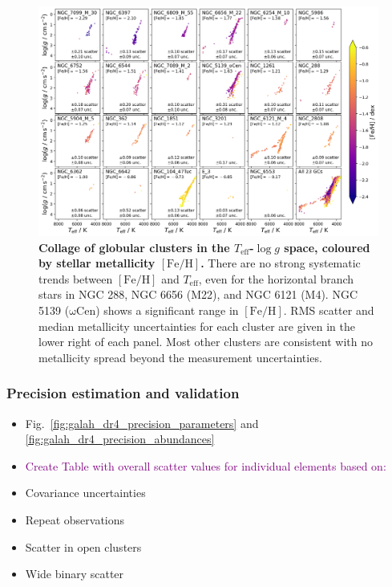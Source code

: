 \documentclass[
  journal=pasa,
  manuscript=research-paper, %
  year=2024,
  volume=37
]{cup-journal}
\newcommand{\SB}[1]{{\textcolor{purple}{#1}}}
\newcommand{\Teff}{$T_\mathrm{eff}$\xspace}
\newcommand{\logg}{$\log g$\xspace}
\newcommand{\feh}{$\mathrm{[Fe/H]}$\xspace}
\begin{document}
\begin{landscape}
\begin{figure}
\includegraphics[width=0.975\columnwidth]{figures/galah_dr4_gcs_teff_logg.png}
\caption{
\textbf{Collage of globular clusters in the \Teff-\logg space, coloured by stellar metallicity \feh.} There are no strong systematic trends between \feh and \Teff, even for the horizontal branch stars in NGC 288, NGC 6656 (M22), and NGC 6121 (M4). NGC 5139 ($\mathrm{\omega}$Cen) shows a significant range in \feh. RMS scatter and median metallicity uncertainties for each cluster are given in the lower right of each panel. Most other clusters are consistent with no metallicity spread beyond the measurement uncertainties. 
}
\label{fig:galah_dr4_gcs_teff_logg}
\end{figure}
\end{landscape}


\subsubsection{Precision estimation and validation} \label{sec:uncertainty_precision}

\begin{itemize}
    \item Fig.~\ref{fig:galah_dr4_precision_parameters} and \ref{fig:galah_dr4_precision_abundances}
    \item \SB{Create Table with overall scatter values for individual elements based on:}
    \item Covariance uncertainties
    \item Repeat observations
    \item Scatter in open clusters
    \item Wide binary scatter
\end{itemize}
\end{document}
